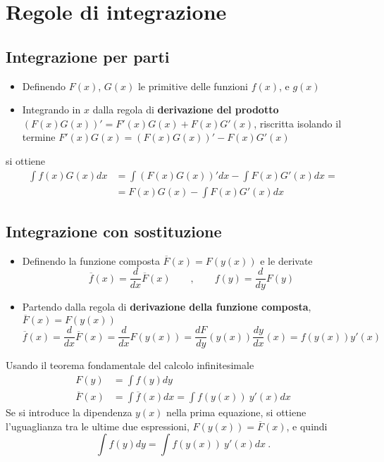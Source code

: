 \section{Regole di integrazione}
\subsection{Integrazione per parti}
\begin{itemize}
 \item Definendo $F(x)$, $G(x)$ le primitive delle funzioni $f(x)$, e $g(x)$
 \item Integrando in $x$ dalla regola di \textbf{derivazione del prodotto} $(F(x)G(x))' = F'(x)G(x) + F(x)G'(x)$, riscritta isolando il termine $F'(x)G(x) = (F(x)G(x))' - F(x)G'(x)$
\end{itemize}
si ottiene
\begin{equation}
\begin{aligned}
    \int f(x) G(x) dx & = \int (F(x) G(x))' dx - \int F(x) G'(x) dx = \\
    &= F(x)G(x) - \int F(x) G'(x) dx 
\end{aligned}
\end{equation}

\begin{example}
\end{example}

\subsection{Integrazione con sostituzione}
\begin{itemize}
    \item Definendo la funzione composta $\overline{F}(x) = F(y(x))$ e le derivate
        \begin{equation}
            \overline{f}(x) = \dfrac{d}{dx} \overline{F}(x) \qquad , \qquad f(y) = \dfrac{d}{dy}F(y)
        \end{equation}
    \item Partendo dalla regola di \textbf{derivazione della funzione composta}, $\overline{F}(x) = F(y(x))$
        \begin{equation}
            \overline{f}(x) = \dfrac{d}{dx} \overline{F}(x) = \dfrac{d}{dx} F(y(x)) = \dfrac{d F}{dy}(y(x)) \dfrac{d y}{d x}(x) = f(y(x)) y'(x)
        \end{equation}
\end{itemize}
Usando il teorema fondamentale del calcolo infinitesimale
\begin{equation}
\begin{aligned}
    F(y) & = \int f(y) dy \\
    \overline{F}(x) & = \int \overline{f}(x) dx = \int f(y(x)) \ y'(x) dx
\end{aligned}
\end{equation}
Se si introduce la dipendenza $y(x)$ nella prima equazione, si ottiene l'uguaglianza tra le ultime due espressioni, $F(y(x)) = \overline{F}(x)$, e quindi
\begin{equation}
  \int f(y) dy = \int f(y(x)) \ y'(x) dx \ .
\end{equation}

\begin{example}
\end{example}
